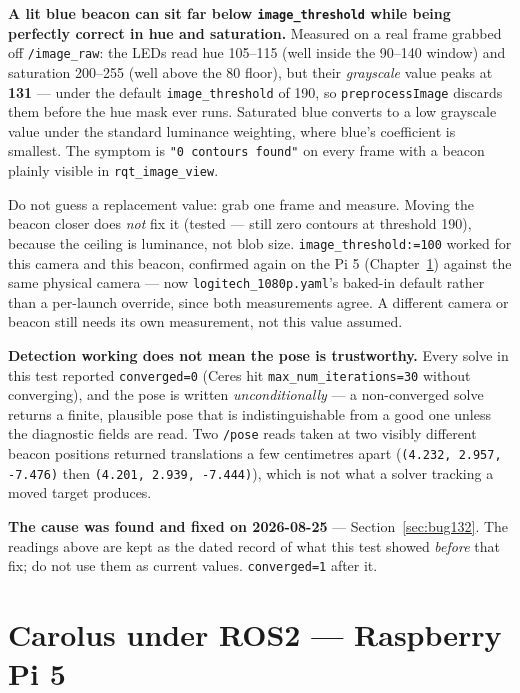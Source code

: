 \documentclass[11pt]{report}
\newenvironment{warningbox}%
  {\begin{lrbox}{\warnbox}\begin{minipage}{0.90\textwidth}}%
  {\end{minipage}\end{lrbox}%
   \begin{center}\fcolorbox{black}{codebg}{\usebox{\warnbox}}\end{center}}
\begin{document}
\begin{warningbox}
\textbf{A lit blue beacon can sit far below \texttt{image\_threshold} while
being perfectly correct in hue and saturation.} Measured on a real frame
grabbed off \texttt{/image\_raw}: the LEDs read hue 105--115 (well inside the
90--140 window) and saturation 200--255 (well above the 80 floor), but their
\emph{grayscale} value peaks at \textbf{131} --- under the default
\texttt{image\_threshold} of 190, so \texttt{preprocessImage} discards them
before the hue mask ever runs. Saturated blue converts to a low grayscale
value under the standard luminance weighting, where blue's coefficient is
smallest. The symptom is \texttt{"0 contours found"} on every frame with a
beacon plainly visible in \texttt{rqt\_image\_view}.

Do not guess a replacement value: grab one frame and measure. Moving the
beacon closer does \emph{not} fix it (tested --- still zero contours at
threshold 190), because the ceiling is luminance, not blob size.
\texttt{image\_threshold:=100} worked for this camera and this beacon,
confirmed again on the Pi 5 (Chapter~\ref{ch:ros2-pi5}) against the same
physical camera --- now \texttt{logitech\_1080p.yaml}'s baked-in default
rather than a per-launch override, since both measurements agree. A
different camera or beacon still needs its own measurement, not this value
assumed.
\end{warningbox}

\begin{warningbox}
\textbf{Detection working does not mean the pose is trustworthy.} Every solve
in this test reported \texttt{converged=0} (Ceres hit
\texttt{max\_num\_iterations=30} without converging), and the pose is written
\emph{unconditionally} --- a non-converged solve returns a finite, plausible
pose that is indistinguishable from a good one unless the diagnostic fields
are read. Two \texttt{/pose} reads taken at two visibly different beacon
positions returned translations a few centimetres apart
(\texttt{(4.232, 2.957, -7.476)} then \texttt{(4.201, 2.939, -7.444)}), which
is not what a solver tracking a moved target produces.

\textbf{The cause was found and fixed on 2026-08-25} ---
Section~\ref{sec:bug132}. The readings above are kept as the dated record of
what this test showed \emph{before} that fix; do not use them as current
values. \texttt{converged=1} after it.
\end{warningbox}

\chapter{Carolus under ROS2 --- Raspberry Pi 5}
\label{ch:ros2-pi5}
\end{document}
